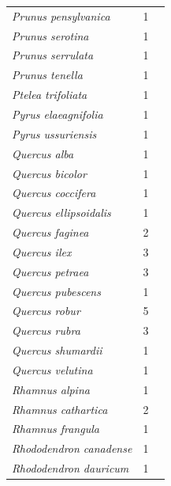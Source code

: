 \documentclass[11pt]{article}
\begin{document}
\begin{longtable}{p{}p{}p{}}
  \emph{Prunus pensylvanica} &   1 & \emph{\citep{flynn2018}} \\ 
  \emph{Prunus serotina} &   1 & \emph{\citep{Laube:2014a}} \\ 
  \emph{Prunus serrulata} &   1 & \emph{\citep{zohner2016}} \\ 
  \emph{Prunus tenella} &   1 & \emph{\citep{zohner2016}} \\ 
  \emph{Ptelea trifoliata} &   1 & \emph{\citep{zohner2016}} \\ 
  \emph{Pyrus elaeagnifolia} &   1 & \emph{\citep{zohner2016}} \\ 
  \emph{Pyrus ussuriensis} &   1 & \emph{\citep{zohner2016}} \\ 
  \emph{Quercus alba} &   1 & \emph{\citep{flynn2018}} \\ 
  \emph{Quercus bicolor} &   1 & \emph{\citep{Laube:2014a}} \\ 
  \emph{Quercus coccifera} &   1 & \emph{\citep{Sanz-Perez:2010aa}} \\ 
  \emph{Quercus ellipsoidalis} &   1 & \emph{\citep{nanninga17}} \\ 
  \emph{Quercus faginea} &   2 & \emph{\citep{Sanz-Perez:2009aa,Sanz-Perez:2010aa}} \\ 
  \emph{Quercus ilex} &   3 & \emph{\citep{Morin:2010aa,Sanz-Perez:2009aa,Sanz-Perez:2010aa}} \\ 
  \emph{Quercus petraea} &   3 & \emph{\citep{Basler:2012,Basler:2014aa,vitra17}} \\ 
  \emph{Quercus pubescens} &   1 & \emph{\citep{Morin:2010aa}} \\ 
  \emph{Quercus robur} &   5 & \emph{\citep{Laube:2014a,Laube:2014b,malyshev2018,Morin:2010aa,zohner2016}} \\ 
  \emph{Quercus rubra} &   3 & \emph{\citep{Calme:1994aa,flynn2018,Laube:2014a}} \\ 
  \emph{Quercus shumardii} &   1 & \emph{\citep{zohner2016}} \\ 
  \emph{Quercus velutina} &   1 & \emph{\citep{flynn2018}} \\ 
  \emph{Rhamnus alpina} &   1 & \emph{\citep{zohner2016}} \\ 
  \emph{Rhamnus cathartica} &   2 & \emph{\citep{nanninga17,zohner2016}} \\ 
  \emph{Rhamnus frangula} &   1 & \emph{\citep{flynn2018}} \\ 
  \emph{Rhododendron canadense} &   1 & \emph{\citep{zohner2016}} \\ 
  \emph{Rhododendron dauricum} &   1 & \emph{\citep{zohner2016}} \\ 

\end{longtable}
\end{document}
